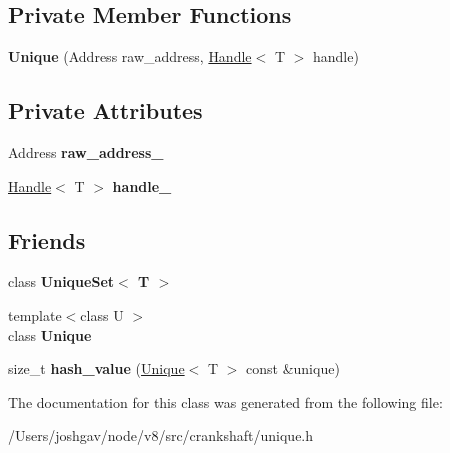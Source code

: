 \subsection*{Private Member Functions}
\begin{DoxyCompactItemize}
\item 
{\bfseries Unique} (Address raw\+\_\+address, \hyperlink{classv8_1_1internal_1_1_handle}{Handle}$<$ T $>$ handle)\hypertarget{classv8_1_1internal_1_1_unique_a6034a98f53e2687254c30e8c6131d2ea}{}\label{classv8_1_1internal_1_1_unique_a6034a98f53e2687254c30e8c6131d2ea}

\end{DoxyCompactItemize}
\subsection*{Private Attributes}
\begin{DoxyCompactItemize}
\item 
Address {\bfseries raw\+\_\+address\+\_\+}\hypertarget{classv8_1_1internal_1_1_unique_a4a89ca58fd5f53ce74a2e060cd23f375}{}\label{classv8_1_1internal_1_1_unique_a4a89ca58fd5f53ce74a2e060cd23f375}

\item 
\hyperlink{classv8_1_1internal_1_1_handle}{Handle}$<$ T $>$ {\bfseries handle\+\_\+}\hypertarget{classv8_1_1internal_1_1_unique_a3390273429be2baccc86336d50ee3d18}{}\label{classv8_1_1internal_1_1_unique_a3390273429be2baccc86336d50ee3d18}

\end{DoxyCompactItemize}
\subsection*{Friends}
\begin{DoxyCompactItemize}
\item 
class {\bfseries Unique\+Set$<$ T $>$}\hypertarget{classv8_1_1internal_1_1_unique_a4ba9e3357ceb16f8c30303b10caad049}{}\label{classv8_1_1internal_1_1_unique_a4ba9e3357ceb16f8c30303b10caad049}

\item 
{\footnotesize template$<$class U $>$ }\\class {\bfseries Unique}\hypertarget{classv8_1_1internal_1_1_unique_a9df4cb329f44d42d59bc1d9cbcb07a16}{}\label{classv8_1_1internal_1_1_unique_a9df4cb329f44d42d59bc1d9cbcb07a16}

\item 
size\+\_\+t {\bfseries hash\+\_\+value} (\hyperlink{classv8_1_1internal_1_1_unique}{Unique}$<$ T $>$ const \&unique)\hypertarget{classv8_1_1internal_1_1_unique_a31b0a160e7fd5a8c538f8bcfc6906440}{}\label{classv8_1_1internal_1_1_unique_a31b0a160e7fd5a8c538f8bcfc6906440}

\end{DoxyCompactItemize}


The documentation for this class was generated from the following file\+:\begin{DoxyCompactItemize}
\item 
/\+Users/joshgav/node/v8/src/crankshaft/unique.\+h\end{DoxyCompactItemize}
